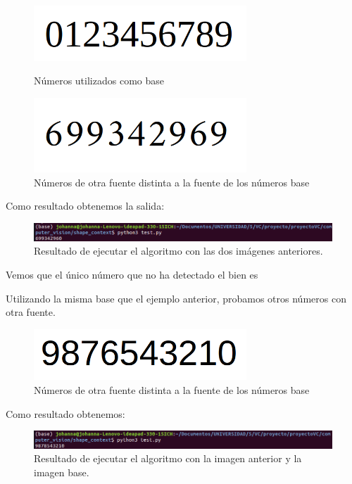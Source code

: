 \documentclass[size=a4, parskip=half, titlepage=false, toc=flat, toc=bib, 12pt]{scrartcl}
\begin{document}
\begin{figure}[H]
\centering
\includegraphics[width=8cm]{./img/base}
\caption{Números utilizados como base}
\includegraphics[width=8cm]{./img/telefono}
\caption{Números de otra fuente distinta a la fuente de los números base}
\end{figure}

Como resultado obtenemos la salida:

\begin{figure}[H]
\centering
\includegraphics[width=15cm]{./img/restelefono}
\caption{Resultado de ejecutar el algoritmo con las dos imágenes anteriores.}
\end{figure}

Vemos que el único número que no ha detectado el bien es

Utilizando la misma base que el ejemplo anterior, probamos otros números con otra fuente.
\begin{figure}[H]
\centering
\includegraphics[width=8cm]{./img/otrafuente}
\caption{Números de otra fuente distinta a la fuente de los números base}
\end{figure}
Como resultado obtenemos:

\begin{figure}[H]
\centering
\includegraphics[width=15cm]{./img/resotra}
\caption{Resultado de ejecutar el algoritmo con la imagen anterior y la imagen base.}
\end{figure}
\end{document}
